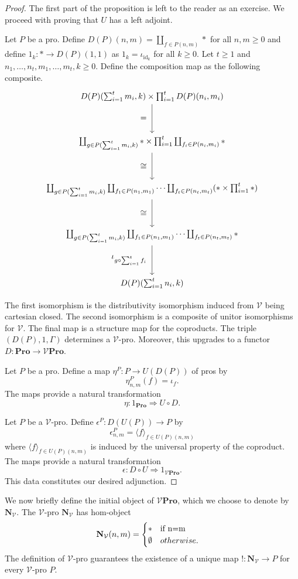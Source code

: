 \documentclass{tac}
\begin{document}
\begin{proof}
The first part of the proposition is left to the reader as an exercise. We proceed with proving that $U$ has a left adjoint.

Let $P$ be a pro. Define $D(P)(n,m)=\coprod_{f\in P(n,m)}*$ for all $n,m\geq 0$ and define $1_k:*\to D(P)(1,1)$ as $1_k=\iota_{\text{id}_k}$ for all $k\geq 0$. Let $t\geq 1$ and $n_1,\dots, n_t,m_1,\dots, m_t,k\geq 0$. Define the composition map as the following composite.
\[
\begin{tikzpicture}[node distance=2cm]
    \node (A) {$D(P)(\sum_{i=1}^tm_i,k)\times\prod_{i=1}^tD(P)(n_i,m_i)$};
    \node (B)[below of=A]{$\coprod_{g\in P(\sum_{i=1}^tm_i,k)}*\times \prod_{i=1}^t\coprod_{f_i\in P(n_i,m_i)}*$};
    \node (C) [below of=B]{$\coprod_{g\in P(\sum_{i=1}^tm_i,k)}\coprod_{f_1\in P(n_1,m_1)}\dots \coprod_{f_t\in P(n_t,m_t)}(*\times\prod_{i=1}^t*)$};
    \node (D)[below of=C]{$\coprod_{g\in P(\sum_{i=1}^tm_i,k)}\coprod_{f_1\in P(n_1,m_1)}\dots \coprod_{f_t\in P(n_t,m_t)}*$};
    \node (E)[below of=D]{$D(P)(\sum_{i=1}^tn_i,k)$};
    \draw[->](A) to node[left=3]{$=$}(B);
    \draw[->](B) to node[left=3]{$\cong$}(C);
    \draw[->](C) to node[left=3]{$\cong$}(D);
    \draw[->](D) to node[left=3]{$\iota_{g\circ\sum_{i=1}^tf_i}$}(E);
\end{tikzpicture}
\]
The first isomorphism is the distributivity isomorphism induced from $\mathcal{V}$ being cartesian closed. The second isomorphism is a composite of unitor isomorphisms for $\mathcal{V}$. The final map is a structure map for the coproducts. The triple $(D(P),1,\Gamma)$ determines a $\mathcal{V}$-pro. Moreover, this upgrades to a functor $D:\mathbf{Pro}\to\mathcal{V}\mathbf{Pro}$.

Let $P$ be a pro. Define a map $\eta^P:P\to U(D(P))$ of pros by
\[
\eta^P_{n,m}(f)=\iota_f.
\]
The maps provide a natural transformation
\[
\eta:1_{\mathbf{Pro}}\Rightarrow U\circ D.
\]

Let $P$ be a $\mathcal{V}$-pro. Define $\epsilon^P:D(U(P))\to P$ by
\[
\epsilon^P_{n,m}=\langle f\rangle_{f\in U(P)(n,m)}
\]
where $\langle f\rangle_{f\in U(P)(n,m)}$ is induced by the universal property of the coproduct. The maps provide a natural transformation
\[
\epsilon:D\circ U\Rightarrow 1_{\mathcal{V}\mathbf{Pro}}.
\]
This data constitutes our desired adjunction.
\end{proof}

We now briefly define the initial object of $\mathcal{V}\mathbf{Pro}$, which we choose to denote by $\mathbf{N}_{\mathcal{V}}$. The $\mathcal{V}$-pro $\mathbf{N}_\mathcal{V}$ has hom-object 
\[
\mathbf{N}_\mathcal{V}(n,m)=\begin{cases}
    *\quad\text{if } $n=m$\\
    \emptyset\quad{otherwise.}
\end{cases}
\]
The definition of $\mathcal{V}$-pro guarantees the existence of a unique map $!:\mathbf{N}_\mathcal{V}\to P$ for every $\mathcal{V}$-pro $P$.
\end{document}
